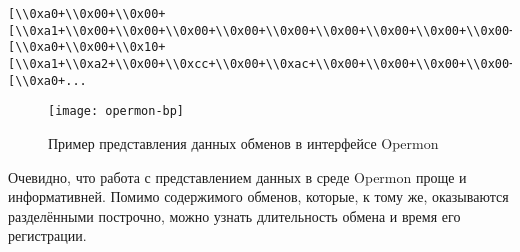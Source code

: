 \begin{lstlisting}[caption=Пример представления данных обменов в консольном интерфейсе Bus Pirate]
 [\\0xa0+\\0x00+\\0x00+[\\0xa1+\\0x00+\\0x00+\\0x00+\\0x00+\\0x00+\\0x00+\\0x00+\\0x00+\\0x00+\\0x00+\\0x00+\\0x00+\\0x00+\\0x00+\\0x00+\\0x00-][\\0xa0+\\0x00+\\0x10+[\\0xa1+\\0xa2+\\0x00+\\0xcc+\\0x00+\\0xac+\\0x00+\\0x00+\\0x00+\\0x00+\\0x00+\\0x00+\\0x00+\\0x00+\\0x00+\\0x00+\\0x00-][\\0xa0+...
\end{lstlisting}

\begin{figure}[H]
 \centering
 \texttt{[image: opermon-bp]}
 \caption{Пример представления данных обменов в интерфейсе Opermon}
 \label{fig:opermon-bp}
\end{figure}

Очевидно, что работа с представлением данных в среде Opermon проще и информативней. Помимо содержимого обменов, которые, к тому же, оказываются разделёнными построчно, можно узнать длительность обмена и время его регистрации.